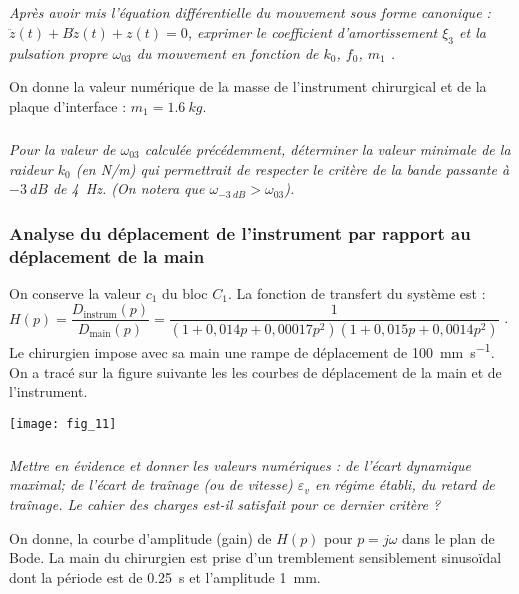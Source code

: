 \begin{multicols}{2}
\subparagraph{}\textit{Après avoir mis l’équation différentielle du mouvement sous forme canonique : $\ddot{z}(t)+B\dot{z}(t)+z(t)=0$, exprimer le coefficient d’amortissement $\xi_3$ et la pulsation propre $\omega_{03}$ du mouvement en fonction de $k_0$, $f_0$, $m_1$ .}
\ifprof
\begin{corrige}
\end{corrige}
\else
\fi

On donne la valeur numérique de la masse de l’instrument chirurgical et de la plaque d’interface : $m_1 = \SI{1,6}{kg}$.


\subparagraph{}\textit{Pour la valeur de $\omega_{03}$ calculée précédemment, déterminer la valeur minimale de la raideur $k_0$ (en N/m) qui permettrait de respecter le critère de la bande passante à $\SI{-3}{dB}$ de \SI{4}{Hz}.
(On notera que $ \omega_{-\SI{3}{dB}}> \omega_{03}$).
}
\ifprof
\begin{corrige}
\end{corrige}
\else
\fi

\subsubsection{Analyse du déplacement de l’instrument par rapport au déplacement de la main}

On conserve la valeur $c_1$ du bloc $C_1$. La fonction de transfert du système est : $H(p)=\dfrac{D_{\text{instrum}}(p)}{D_{\text{main}}(p)}=\dfrac{1}{\left(1+0,014p+0,00017p^2 \right)\left( 1+0,015p+0,0014p^2\right)}$ .
Le chirurgien impose avec sa main une rampe de déplacement  de \SI{100}{mm.s^{-1}}. On a tracé sur la figure suivante les les courbes de déplacement de la main et de l’instrument.


\begin{center}
\texttt{[image: fig\_11]}
\end{center}


\subparagraph{}\textit{Mettre en évidence et donner les valeurs numériques :
de l’écart dynamique maximal; de l’écart de traînage (ou de vitesse) $\varepsilon_v$ en régime établi, du retard de traînage. Le cahier des charges est-il satisfait pour ce dernier critère ?
}
\ifprof
\begin{corrige}
\end{corrige}
\else
\fi


On donne, la courbe d’amplitude (gain) de $H(p)$ pour $p = j\omega$ dans le plan de Bode. 
La main du chirurgien est prise d’un tremblement sensiblement sinusoïdal dont la période est de \SI{0,25}{s} et l’amplitude \SI{1}{mm}. 



\end{multicols}
